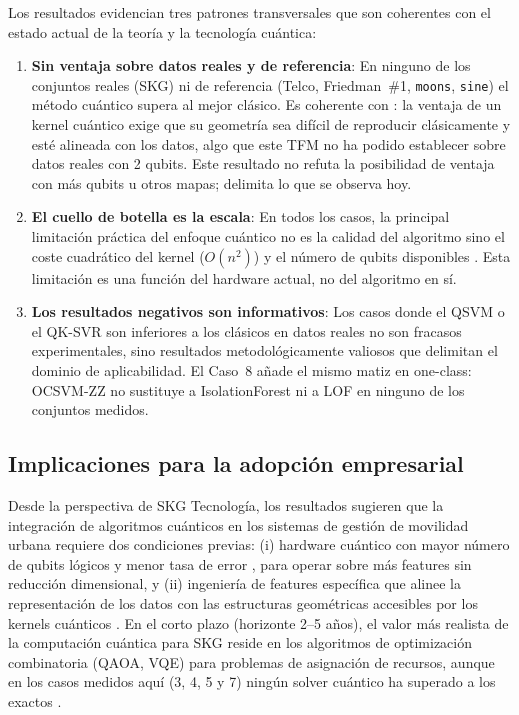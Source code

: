 Los resultados evidencian tres patrones transversales que son coherentes con el estado actual de la teoría y la tecnología cuántica:

\begin{enumerate}
  \item \textbf{Sin ventaja sobre datos reales y de referencia}: En ninguno de los conjuntos reales (SKG) ni de referencia (Telco, Friedman~\#1, \texttt{moons}, \texttt{sine}) el método cuántico supera al mejor clásico. Es coherente con \cite{huang2021}: la ventaja de un kernel cuántico exige que su geometría sea difícil de reproducir clásicamente y esté alineada con los datos, algo que este TFM no ha podido establecer sobre datos reales con 2 qubits. Este resultado no refuta la posibilidad de ventaja con más qubits u otros mapas; delimita lo que se observa hoy.

  \item \textbf{El cuello de botella es la escala}: En todos los casos, la principal limitación práctica del enfoque cuántico no es la calidad del algoritmo sino el coste cuadrático del kernel ($O(n^2)$) y el número de qubits disponibles \citep{haug2023, cerezo2021}. Esta limitación es una función del hardware actual, no del algoritmo en sí.

  \item \textbf{Los resultados negativos son informativos}: Los casos donde el QSVM o el QK-SVR son inferiores a los clásicos en datos reales no son fracasos experimentales, sino resultados metodológicamente valiosos que delimitan el dominio de aplicabilidad. El Caso~8 añade el mismo matiz en one-class: OCSVM-ZZ no sustituye a IsolationForest ni a LOF en ninguno de los conjuntos medidos.
\end{enumerate}

\subsection{Implicaciones para la adopción empresarial}

Desde la perspectiva de SKG Tecnología, los resultados sugieren que la integración de algoritmos cuánticos en los sistemas de gestión de movilidad urbana requiere dos condiciones previas: (i) hardware cuántico con mayor número de qubits lógicos y menor tasa de error \citep{preskill2018, cerezo2023}, para operar sobre más features sin reducción dimensional, y (ii) ingeniería de features específica que alinee la representación de los datos con las estructuras geométricas accesibles por los kernels cuánticos \citep{huang2021}. En el corto plazo (horizonte 2--5 años), el valor más realista de la computación cuántica para SKG reside en los algoritmos de optimización combinatoria (QAOA, VQE) para problemas de asignación de recursos, aunque en los casos medidos aquí (3, 4, 5 y 7) ningún solver cuántico ha superado a los exactos \citep{farhi2014}.

